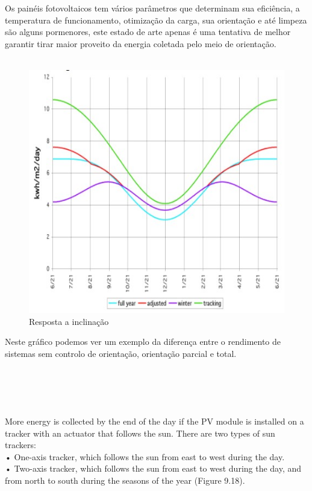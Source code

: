 \qquad Os painéis fotovoltaicos tem vários parâmetros que determinam sua eficiência, a temperatura de funcionamento, otimização da carga, sua orientação e até limpeza são alguns pormenores, este estado de arte apenas é uma tentativa de melhor garantir tirar maior proveito da energia coletada pelo meio de orientação.\\
\\
\begin{minipage}{0.5\linewidth}
\begin{figure}[H]
	\includegraphics[scale=0.6]{./image/Graph/Anualkwh_1.jpg}
	\caption{Resposta a inclinação}
\end{figure}
\end{minipage}
\begin{minipage}[t]{0.5\linewidth}
\flushleft
Neste gráfico podemos ver um exemplo da diferença entre o rendimento de sistemas sem controlo de orientação, orientação parcial e total.\\
\end{minipage}\\
\\
\\
\\
More energy is collected by the end of the day if the PV module is installed on a tracker with an actuator that follows the sun. There are two types of sun trackers:\\
• One-axis tracker, which follows the sun from east to west during the day.\\
• Two-axis tracker, which follows the sun from east to west during the day, and from north to south during the seasons of the year (Figure 9.18).\cite{book_2} \\

